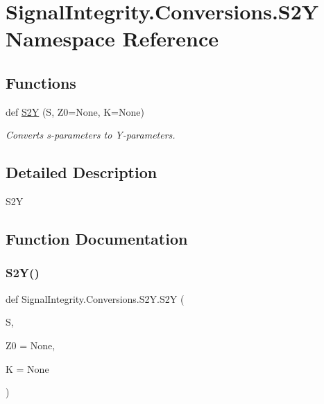 \hypertarget{namespaceSignalIntegrity_1_1Conversions_1_1S2Y}{}\section{Signal\+Integrity.\+Conversions.\+S2Y Namespace Reference}
\label{namespaceSignalIntegrity_1_1Conversions_1_1S2Y}
\subsection*{Functions}
\begin{DoxyCompactItemize}
\item 
def \hyperlink{namespaceSignalIntegrity_1_1Conversions_1_1S2Y_a665339bfae7ae3e6685959f1abc2aafa}{S2Y} (S, Z0=None, K=None)
\begin{DoxyCompactList}\small\item\em Converts s-\/parameters to Y-\/parameters. \end{DoxyCompactList}\end{DoxyCompactItemize}


\subsection{Detailed Description}
\begin{DoxyVerb}S2Y\end{DoxyVerb}
 

\subsection{Function Documentation}
\mbox{\label{namespaceSignalIntegrity_1_1Conversions_1_1S2Y_a665339bfae7ae3e6685959f1abc2aafa}} 
\subsubsection{\texorpdfstring{S2\+Y()}{S2Y()}}
{\footnotesize\ttfamily def Signal\+Integrity.\+Conversions.\+S2\+Y.\+S2Y (\begin{DoxyParamCaption}\item[{}]{S,  }\item[{}]{Z0 = {\ttfamily None},  }\item[{}]{K = {\ttfamily None} }\end{DoxyParamCaption})}



